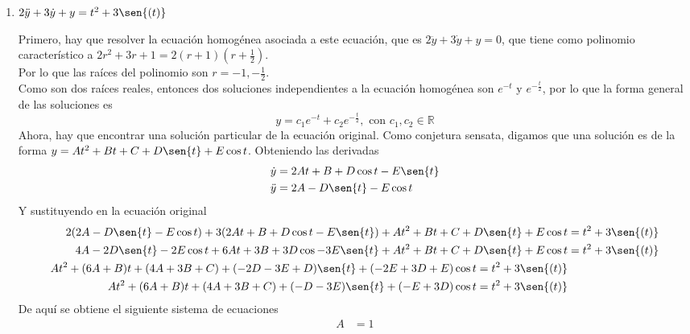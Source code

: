 \documentclass{article}
\begin{document}
\begin{enumerate}
{        }
        \item {
            $2\ddot y+3\dot y+y=t^2+3\sen{(t)}$

            \color{azul}
            Primero, hay que resolver la ecuación homogénea asociada a 
            este ecuación, que es $2\ddot y+3\dot y+y=0$, que tiene como
            polinomio característico a $2r^2+3r+1 =
            2(r+1)(r+\frac{1}{2})$.\\
            Por lo que las raíces del polinomio son $r = -1, -\frac{1}{2}$.\\
            Como son dos raíces reales, entonces dos soluciones
            independientes a la ecuación homogénea son $e^{-t}$ y 
            $e^{-\frac{t}{2}}$, por lo que la forma general de las
            soluciones es
            \[y = c_1e^{-t} + c_2e^{-\frac{t}{2}}, \text{ con }
            c_1, c_2 \in \mathbb{R}\]
            Ahora, hay que encontrar una solución particular de la
            ecuación original.
            Como conjetura sensata, digamos que una solución es de la 
            forma $y = At^2+Bt+C+D\sen{t}+E\cos{t}$.
            Obteniendo las derivadas
            \begin{align*}
                \dot y &= 2At + B + D\cos{t} - E\sen{t} \\
                \ddot y &= 2A - D\sen{t} - E\cos{t}
            \end{align*}
            Y sustituyendo en la ecuación original
            \begin{align*}
                2(2A - D\sen{t} - E\cos{t}) +
                3(2At + B + D\cos{t} - E\sen{t}) +
                At^2 + Bt + C + D\sen{t} + E\cos{t} &=
                t^2+3\sen{(t)} \\
                4A - 2D\sen{t} - 2E\cos{t} +
                6At + 3B + 3D\cos - 3E\sen{t} +
                At^2 + Bt + C + D\sen{t} + E\cos{t} &=
                t^2+3\sen{(t)} \\
                At^{2} + (6A + B)t + (4A + 3B + C) + (-2D-3E+D)\sen{t} +
                (-2E+3D+E)\cos{t} = t^2+3\sen{(t)} \\
                 At^{2} + (6A + B)t + (4A + 3B + C) + (-D-3E)\sen{t} +
                (-E+3D)\cos{t} = t^2+3\sen{(t)}
            \end{align*}
            De aquí se obtiene el siguiente sistema de ecuaciones
            \begin{align*}
                A &= 1 \\

\end{align*}}
\end{enumerate}
\end{document}

